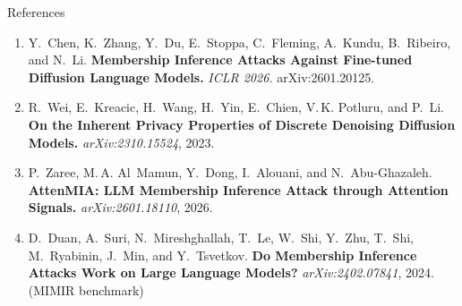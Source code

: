 \documentclass[aspectratio=169,10pt]{beamer}
\begin{document}
\begin{frame}[allowframebreaks]{References}
  \scriptsize
  \begin{enumerate}
    \setlength\itemsep{0.5em}

    \item Y.~Chen, K.~Zhang, Y.~Du, E.~Stoppa, C.~Fleming, A.~Kundu,
      B.~Ribeiro, and N.~Li.
      \textbf{Membership Inference Attacks Against Fine-tuned Diffusion Language
      Models.}
      \textit{ICLR 2026.} arXiv:2601.20125.

    \item R.~Wei, E.~Kreacic, H.~Wang, H.~Yin, E.~Chien, V.\,K. Potluru,
      and P.~Li.
      \textbf{On the Inherent Privacy Properties of Discrete Denoising Diffusion
      Models.}
      \textit{arXiv:2310.15524}, 2023.

    \item P.~Zaree, M.\,A. Al~Mamun, Y.~Dong, I.~Alouani, and N.~Abu-Ghazaleh.
      \textbf{AttenMIA: LLM Membership Inference Attack through Attention
      Signals.}
      \textit{arXiv:2601.18110}, 2026.

    \item D.~Duan, A.~Suri, N.~Mireshghallah, T.~Le, W.~Shi, Y.~Zhu,
      T.~Shi, M.~Ryabinin, J.~Min, and Y.~Tsvetkov.
      \textbf{Do Membership Inference Attacks Work on Large Language Models?}
      \textit{arXiv:2402.07841}, 2024. (MIMIR benchmark)

  \end{enumerate}
\end{frame}

\end{document}
